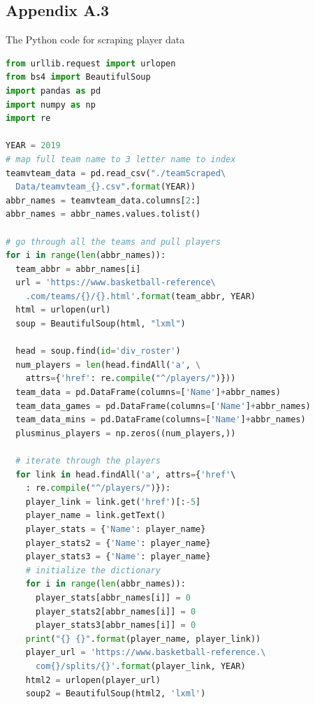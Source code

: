 \documentclass[12pt]{article}%
\begin{document}
\subsection{Appendix A.3}
The Python code for scraping player data
\begin{lstlisting}[language=Python]
from urllib.request import urlopen
from bs4 import BeautifulSoup
import pandas as pd
import numpy as np
import re

YEAR = 2019
# map full team name to 3 letter name to index
teamvteam_data = pd.read_csv("./teamScraped\
  Data/teamvteam_{}.csv".format(YEAR))
abbr_names = teamvteam_data.columns[2:]
abbr_names = abbr_names.values.tolist()

# go through all the teams and pull players
for i in range(len(abbr_names)):
  team_abbr = abbr_names[i]
  url = 'https://www.basketball-reference\
    .com/teams/{}/{}.html'.format(team_abbr, YEAR)
  html = urlopen(url)
  soup = BeautifulSoup(html, "lxml")
  
  head = soup.find(id='div_roster')
  num_players = len(head.findAll('a', \
    attrs={'href': re.compile("^/players/")}))
  team_data = pd.DataFrame(columns=['Name']+abbr_names)
  team_data_games = pd.DataFrame(columns=['Name']+abbr_names)
  team_data_mins = pd.DataFrame(columns=['Name']+abbr_names)
  plusminus_players = np.zeros((num_players,))

  # iterate through the players
  for link in head.findAll('a', attrs={'href'\
    : re.compile("^/players/")}):
    player_link = link.get('href')[:-5]
    player_name = link.getText()
    player_stats = {'Name': player_name}
    player_stats2 = {'Name': player_name}
    player_stats3 = {'Name': player_name}
    # initialize the dictionary
    for i in range(len(abbr_names)):
      player_stats[abbr_names[i]] = 0
      player_stats2[abbr_names[i]] = 0
      player_stats3[abbr_names[i]] = 0
    print("{} {}".format(player_name, player_link))
    player_url = 'https://www.basketball-reference.\
      com{}/splits/{}'.format(player_link, YEAR)
    html2 = urlopen(player_url)
    soup2 = BeautifulSoup(html2, 'lxml')


\end{lstlisting}
\end{document}
